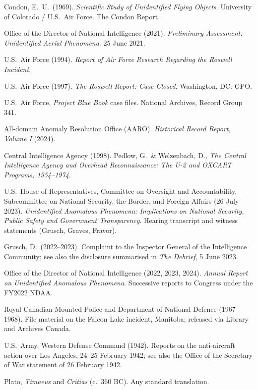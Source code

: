 \begin{list}{}{\setlength{\leftmargin}{1.2em}\setlength{\itemindent}{-1.2em}
\setlength{\itemsep}{3pt}}
\item Condon, E.\ U.\ (1969). \emph{Scientific Study of Unidentified Flying Objects}. University of
Colorado / U.S.\ Air Force. The Condon Report.
\item Office of the Director of National Intelligence (2021). \emph{Preliminary Assessment:
Unidentified Aerial Phenomena}. 25 June 2021.
\item U.S.\ Air Force (1994). \emph{Report of Air Force Research Regarding the Roswell Incident}.
\item U.S.\ Air Force (1997). \emph{The Roswell Report: Case Closed}. Washington, DC: GPO.
\item U.S.\ Air Force, \emph{Project Blue Book} case files. National Archives, Record Group 341.
\item All-domain Anomaly Resolution Office (AARO). \emph{Historical Record Report, Volume I} (2024).
\item Central Intelligence Agency (1998). Pedlow, G.\ \& Welzenbach, D., \emph{The Central
Intelligence Agency and Overhead Reconnaissance: The U-2 and OXCART Programs, 1954--1974}.
\item U.S.\ House of Representatives, Committee on Oversight and Accountability, Subcommittee on
National Security, the Border, and Foreign Affairs (26 July 2023). \emph{Unidentified Anomalous
Phenomena: Implications on National Security, Public Safety and Government Transparency}. Hearing
transcript and witness statements (Grusch, Graves, Fravor).
\item Grusch, D.\ (2022--2023). Complaint to the Inspector General of the Intelligence Community;
see also the disclosure summarised in \emph{The Debrief}, 5 June 2023.
\item Office of the Director of National Intelligence (2022, 2023, 2024). \emph{Annual Report on
Unidentified Anomalous Phenomena}. Successive reports to Congress under the FY2022 NDAA.
\item Royal Canadian Mounted Police and Department of National Defence (1967--1968). File
material on the Falcon Lake incident, Manitoba; released via Library and Archives Canada.
\item U.S.\ Army, Western Defense Command (1942). Reports on the anti-aircraft action over Los
Angeles, 24--25 February 1942; see also the Office of the Secretary of War statement of 26 February
1942.
\item Plato, \emph{Timaeus} and \emph{Critias} (c.\ 360 BC). Any standard translation.

\end{list}

